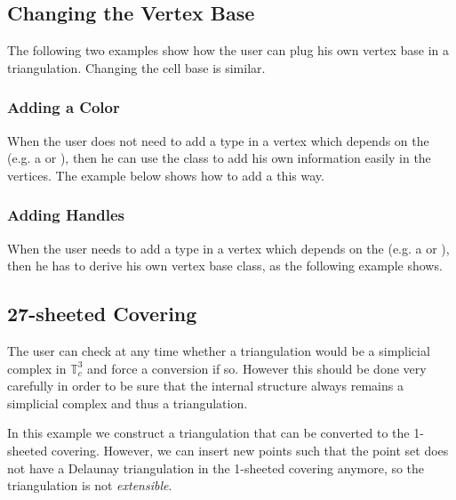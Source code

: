 
\subsection{Changing the Vertex Base}
The following two examples show how the user can plug his own vertex base in a
triangulation.  Changing the cell base is similar.

\subsubsection{Adding a Color\label{P3Triangulation3-sec-examples-color}}
When the user does not need to add a type in a vertex which depends on the
 (e.g. a  or
), then he can use the
 class to add his own information
easily in the vertices.  The example below shows how to add a 
this way.


\subsubsection{Adding Handles}
When the user needs to add a type in a vertex which depends on the
 (e.g. a  or
), then he has to derive his own vertex base class,
as the following example shows.


\subsection{27-sheeted Covering}
The user can check at any time whether a triangulation would be a
simplicial complex in $\mathbb T_c^3$ and force a conversion if
so. However this should be done very carefully in order to be sure
that the internal structure always remains a simplicial complex and
thus a triangulation.

In this example we construct a triangulation that can be converted to
the 1-sheeted covering. However, we can insert new points such that the
point set does not have a Delaunay triangulation in the 1-sheeted
covering anymore, so the triangulation is not \emph{extensible}.

